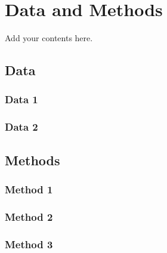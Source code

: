 \newpage
\chapter{Data and Methods}
\label{dm}

\setcounter{figure}{0}
\setcounter{table}{0}
\setcounter{equation}{0}

Add your contents here.

\section{Data}

\subsection{Data 1}

\subsection{Data 2}

\section{Methods}

\subsection{Method 1}

\subsection{Method 2}

\subsection{Method 3}

